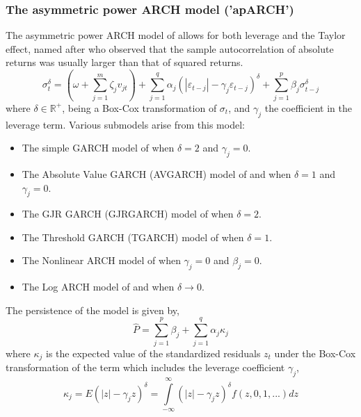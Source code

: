 \subsubsection{The asymmetric power ARCH model ('apARCH')}\label{section:aparch}
The asymmetric power ARCH model of \cite{Ding1993} allows for both leverage and
the Taylor effect, named after \cite{Taylor1986} who observed that the sample
autocorrelation of absolute returns was usually larger than that of squared
returns.
\begin{equation}\label{eq:aparch}
\sigma _t^\delta  = \left( {\omega  + \sum\limits_{j = 1}^m {{\zeta _j}{v_{jt}}} } \right) + \sum\limits_{j = 1}^q {{\alpha _j}{{\left( {\left| {{\varepsilon _{t - j}}} \right| - {\gamma _j}{\varepsilon _{t - j}}} \right)}^\delta } + } \sum\limits_{j = 1}^p {{\beta _j}\sigma _{t - j}^\delta }
\end{equation}
where $\delta  \in {\mathbb{R}^ + }$, being a Box-Cox transformation of $\sigma_t$,
and $\gamma_j$ the coefficient in the leverage term. Various submodels arise
from this model:
\begin{itemize}
\item The simple GARCH model of \cite{Bollerslev1986} when $\delta=2$ and $\gamma_j=0$.
\item The Absolute Value GARCH (AVGARCH) model of \cite{Taylor1986} and \cite{Schwert1990} when $\delta=1$ and $\gamma_j=0$.
\item The GJR GARCH (GJRGARCH) model of \cite{Glosten1993} when $\delta=2$.
\item The Threshold GARCH (TGARCH) model of \cite{Zakoian1994} when $\delta=1$.
\item The Nonlinear ARCH model of \cite{Higgins1992} when $\gamma_j=0$ and $\beta_j=0$.
\item The Log ARCH model of \cite{Geweke1986} and \cite{Pantula1986} when $\delta  \to 0$.
\end{itemize}
The persistence of the model is given by,
\begin{equation}\label{eq:aparchp}
\hat P = \sum\limits_{j = 1}^p {{\beta_j} + } \sum\limits_{j = 1}^q {{\alpha_j}} {\kappa_j}
\end{equation}
where $\kappa_j$ is the expected value of the standardized residuals $z_t$ under
the Box-Cox transformation of the term which includes the leverage coefficient
$\gamma_j$,
\begin{equation}\label{eq:aparchkappa}
\kappa_j  = E{\left( {\left| z \right| - {\gamma _j}z} \right)^\delta } = \int\limits_{ - \infty }^\infty  {{{\left( {\left| z \right| - {\gamma _j}z} \right)}^\delta }f\left( {z,0,1,...} \right)dz}
\end{equation}
